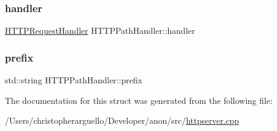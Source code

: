 \mbox{\label{struct_h_t_t_p_path_handler_ad741823790ab387e0962875861a91e67}} 
\subsubsection{\texorpdfstring{handler}{handler}}
{\footnotesize\ttfamily \mbox{\hyperlink{httpserver_8h_a90b0a9a188f591e83851dad2b701088f}{H\+T\+T\+P\+Request\+Handler}} H\+T\+T\+P\+Path\+Handler\+::handler}

\mbox{\label{struct_h_t_t_p_path_handler_a3653c57a029382a867dc68e102a353cf}} 
\subsubsection{\texorpdfstring{prefix}{prefix}}
{\footnotesize\ttfamily std\+::string H\+T\+T\+P\+Path\+Handler\+::prefix}



The documentation for this struct was generated from the following file\+:\begin{DoxyCompactItemize}
\item 
/\+Users/christopherarguello/\+Developer/anon/src/\mbox{\hyperlink{httpserver_8cpp}{httpserver.\+cpp}}\end{DoxyCompactItemize}
